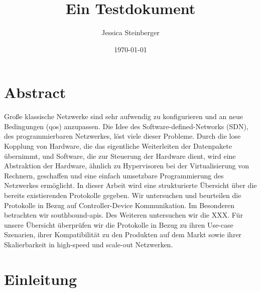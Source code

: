 \documentclass[twoside,12pt]{scrartcl}
\title{Ein Testdokument}
\author{Jessica Steinberger}
\date{\today}
\begin{document}
	
	
	
	\pagestyle{scrheadings}
	\clearscrheadfoot
	\ohead{\leftmark}
	\ifoot{\pagemark} 
	\setheadsepline{1pt} 
	\setfootsepline{1pt}
	
	
	\maketitle
	
	\tableofcontents
	
	\newpage
	
	\printglossary[type=\acronymtype,style=longwithindent]
	\newpage
	
	\printglossary[type=symbolslist,style=long]
	
	\newpage
	
	\section{Abstract}
	
	Große klassische Netzwerke sind sehr aufwendig zu konfigurieren und an neue Bedingungen (qos) anzupassen. Die Idee des Software-defined-Networks (SDN), des programmierbaren Netzwerkes, löst viele dieser Probleme. Durch die lose Kopplung von Hardware, die das eigentliche Weiterleiten der Datenpakete übernimmt, und Software, die zur Steuerung der Hardware dient, wird eine Abstraktion der Hardware, ähnlich zu Hypervisoren bei der Virtualisierung von Rechnern, geschaffen und eine einfach umsetzbare Programmierung des Netzwerkes ermöglicht. In dieser Arbeit wird eine strukturierte Übersicht über die bereits existierenden Protokolle gegeben. Wir untersuchen und beurteilen die Protokolle in Bezug auf Controller-Device Kommunikation. Im Besonderen betrachten wir southbound-apis. Des Weiteren untersuchen wir die XXX. Für unsere Übersicht überprüfen wir die Protokolle in Bezug zu ihren Use-case Szenarien, ihrer Kompatibilität zu den Produkten auf dem Markt sowie ihrer Skalierbarkeit in high-speed und scale-out Netzwerken.
	
	\section{Einleitung}
	
\end{document}
